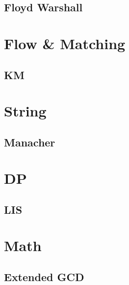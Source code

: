     \subsection{Floyd Warshall}
        

\section{Flow \& Matching}
    \subsection{KM}
        

\section{String}
    \subsection{Manacher}
        

\section{DP}
    \subsection{LIS}
        

\section{Math}
    \subsection{Extended GCD}
        